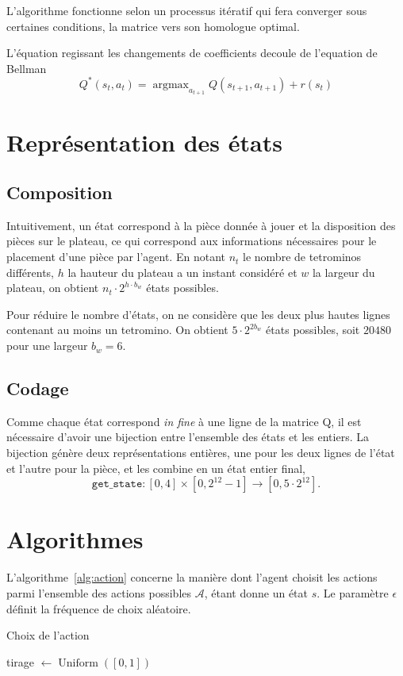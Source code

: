 \documentclass{report}
\DeclareMathOperator{\argmax}{argmax}
\DeclareMathOperator{\uniform}{Uniform}
\begin{document}
L'algorithme fonctionne selon un processus itératif qui fera converger sous
certaines conditions, la matrice vers son homologue optimal.

L'équation regissant les changements de coefficients decoule de l'equation de
Bellman\cite{mengin}
\[
  Q^*(s_t, a_t) = \argmax_{a_{t+1}}Q(s_{t+1}, a_{t+1}) + r(s_t)
\]

\section{Représentation des états}

\subsection{Composition}
Intuitivement, un état correspond à la pièce donnée à jouer et la disposition
des pièces sur le plateau, ce qui correspond aux informations nécessaires pour
le placement d'une pièce par l'agent. En notant \(n_t\) le nombre de tetrominos
différents, \( h \) la hauteur du plateau a un instant considéré  et \(w\) la
largeur du plateau, on obtient \(n_t \cdot 2^{h \cdot b_w}\) états possibles.

Pour réduire le nombre d'états, on ne considère que les deux plus hautes lignes
contenant au moins un tetromino. On obtient \(5\cdot 2^{2 b_w}\) états
possibles, soit \(20480\) pour une largeur \( b_w = 6 \).

\subsection{Codage}
Comme chaque état correspond \textit{in fine} à une ligne de la matrice Q, il est
nécessaire d'avoir une bijection entre l'ensemble des états et les entiers. La
bijection génère deux représentations entières, une pour les deux lignes de
l'état et l'autre pour la pièce, et les combine en un état entier final,
\[
  \texttt{get\_state}\colon [0,4]\times [0, 2^{12} - 1] \to [0, 5\cdot 2^{12}].
\]


\section{Algorithmes}\label{sec:algorithmes}

L'algorithme~\ref{alg:action} concerne la manière dont l'agent choisit les
actions parmi l'ensemble des actions possibles \(\mathcal{A}\), étant donne un
état \(s\). Le paramètre \(\epsilon\) définit la fréquence de choix aléatoire.
\begin{algorithm}
  \caption{Choix de l'action}\label{alg:action}
  \begin{algorithmic}
    [1]
    \State{} tirage \(\gets \uniform([0, 1])\)
    \Return{\(\argmax_{a\in\mathcal{A}} Q(s, a)\)}
    \Else{}
    \Return{\(\uniform(\mathcal{A})\)}
    \EndIf{}
    \EndProcedure{}
  \end{algorithmic}
\end{algorithm}
\end{document}
